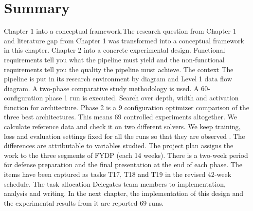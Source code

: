 \section{Summary}

 Chapter 1 into a conceptual framework.The research question from Chapter 1 and literature gap from Chapter 1 was transformed into a conceptual framework in this chapter. Chapter 2 into a concrete experimental design. Functional requirements tell you what the pipeline must yield and the non-functional requirements tell you the quality the pipeline must achieve. The context
The pipeline is put in its research environment by diagram and Level 1 data flow diagram.
A two-phase comparative study methodology is used. A 60-configuration phase 1 run is executed. Search over depth, width and activation function for architecture. Phase 2 is a 9 configuration optimizer comparison of the three best architectures. This means 69 controlled experiments altogether. We calculate reference data and check it on two different solvers.
We keep training, loss and evaluation settings fixed for all the runs so that they are observed . The differences are attributable to variables studied. The project plan assigns the work to the three segments of FYDP (each 14 weeks). There is a two-week period for defense preparation and the final presentation at the end of each phase. The items have been captured as tasks T17, T18 and T19 in the revised 42-week schedule. The task allocation Delegates team members to implementation, analysis and writing. In the next chapter, the implementation of this design and the experimental results from it are reported 69 runs.
